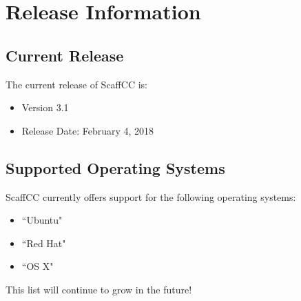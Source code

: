 \chapter{Release Information}\label{ch:release}
\section{Current Release}
    The current release of ScaffCC is:
    \begin{itemize}
        \item Version 3.1
        \item Release Date: February 4, 2018
    \end{itemize}
\section{Supported Operating Systems}
    ScaffCC currently offers support for the following operating systems:
    \begin{itemize}
        \item ``Ubuntu"
        \item ``Red Hat"
        \item ``OS X"
    \end{itemize}
    This list will continue to grow in the future!

